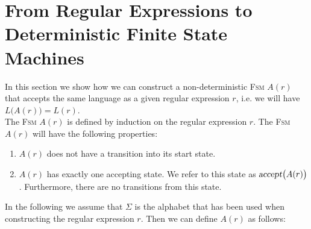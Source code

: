 \section{From Regular Expressions to Deterministic Finite State Machines}
In this section we show how we can construct a non-deterministic \textsc{Fsm} $A(r)$ that accepts the same language as
a given regular expression $r$, i.e. we will have
\\[0.2cm]
\hspace*{1.3cm}
$L\bigl(A(r)\bigr) = L(r)$.
\\[0.2cm]
The \textsc{Fsm} $A(r)$ is defined by induction on the regular expression $r$.  The \textsc{Fsm} $A(r)$ will
have the following properties:
\begin{enumerate}
\item $A(r)$ does not have a transition into its start state.  
\item $A(r)$ has exactly one accepting state.  We refer to this state as
      $\textsl{accept}\bigl(A(r)\bigr)$.  Furthermore, there are no transitions from this state.
\end{enumerate}
In the following we assume that $\Sigma$ is the alphabet that has been used when constructing the regular
expression $r$.  Then we can define $A(r)$ as follows:
